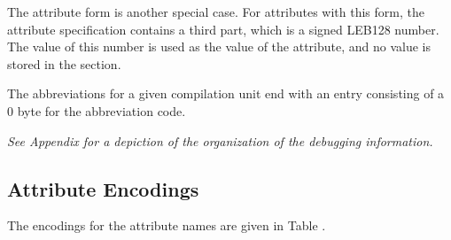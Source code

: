 The attribute form \DWFORMimplicitconstTARG{} is another special case.
For attributes with this form, the attribute specification contains 
a third part, which is a signed LEB128 
number. The value of this number is used as the value of the 
attribute, and no value is stored in the \dotdebuginfo{} section.

The abbreviations for a given compilation unit end with an
entry consisting of a 0 byte for the abbreviation code.

\textit{See 
Appendix  
for a depiction of the organization of the
debugging information.}

\subsection{Attribute Encodings}
\label{datarep:attributeencodings}

The encodings for the attribute names are given in 
Table .

